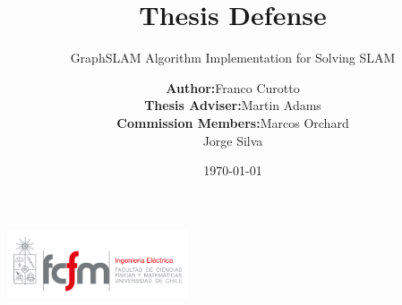 \documentclass{beamer}
\title[GraphSLAM Implementation]{Thesis Defense}
\subtitle{GraphSLAM Algorithm Implementation for Solving SLAM}
\date{\vspace{0em}\today}
\begin{document}
	
\begin{frame}
\author{
\hspace{-4em}
\begin{tabular}{rl} 
 \textbf{Author:}  & Franco Curotto \\
 \textbf{Thesis Adviser:} & Martin Adams \\ 
 \textbf{Commission Members:} & Marcos Orchard \\
 & Jorge Silva
\end{tabular}
\vspace{0em}
}
    \includegraphics[width=0.4\textwidth]{img/fcfm_die.pdf}
    \titlepage
\end{frame}

\end{document}

